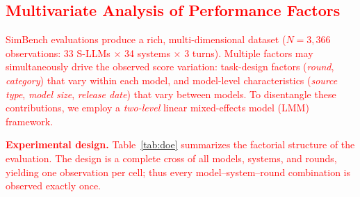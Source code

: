 \documentclass{ieeeaccess}
\newcommand{\updatedText}[1]{\textcolor{red}{#1}}
\newcommand{\noindentBold}[1]{\par\noindent\textbf{#1}}
\begin{document}

\updatedText{\subsection{Multivariate Analysis of Performance Factors}}
\label{subsec:multivariate}

\updatedText{SimBench evaluations produce a rich, multi-dimensional dataset
($N = 3{,}366$ observations: 33 S-LLMs $\times$ 34 systems $\times$ 3 turns).
Multiple factors may simultaneously drive the observed score variation:
task-design factors (\emph{round}, \emph{category}) that vary within each
model, and model-level characteristics (\emph{source type}, \emph{model
size}, \emph{release date}) that vary between models.
To disentangle these contributions, we employ a \emph{two-level}
linear mixed-effects model (LMM) framework.}

\medskip
\updatedText{\noindentBold{Experimental design.}
Table~\ref{tab:doe} summarizes the factorial structure of the evaluation.
The design is a complete cross of all models, systems, and rounds,
yielding one observation per cell; thus every
model--system--round combination is observed exactly once.}
\end{document}
